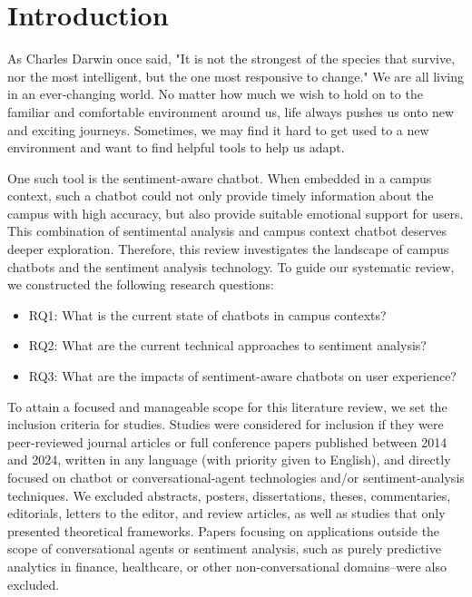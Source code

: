 \documentclass{xum_review}
\begin{document}
\tableofcontents
\newpage
\setcounter{page}{1}

\section{Introduction}
As Charles Darwin once said, "It is not the strongest of the species that
survive, nor the most intelligent, but the one most responsive to change." We
are all living in an ever-changing world. No matter how much we wish to hold on
to the familiar and comfortable environment around us, life always pushes us
onto new and exciting journeys. Sometimes, we may find it hard to get used to a
new environment and want to find helpful tools to help us adapt. 

One such tool is the sentiment-aware chatbot. When embedded in a campus context,
such a chatbot could not only provide timely information about the campus with
high accuracy, but also provide suitable emotional support for users. This
combination of sentimental analysis and campus context chatbot deserves deeper
exploration. Therefore, this review investigates the landscape of campus
chatbots and the sentiment analysis technology. To guide our systematic review,
we constructed the following research questions:
\begin{itemize}
    \item RQ1: What is the current state of chatbots in campus contexts?
    \item RQ2: What are the current technical approaches to sentiment
    analysis?
    \item RQ3: What are the impacts of sentiment-aware chatbots on user
    experience?
\end{itemize}

To attain a focused and manageable scope for this literature review, we set the
inclusion criteria for studies. Studies were considered for inclusion if they
were peer-reviewed journal articles or full conference papers published between
2014 and 2024, written in any language (with priority given to English), and
directly focused on chatbot or conversational-agent technologies and/or
sentiment-analysis techniques. We excluded abstracts, posters, dissertations,
theses, commentaries, editorials, letters to the editor, and review articles, as
well as studies that only presented theoretical frameworks. Papers focusing on
applications outside the scope of conversational agents or sentiment
analysis, such as purely predictive analytics in finance, healthcare, or other
non-conversational domains--were also excluded.
\end{document}

